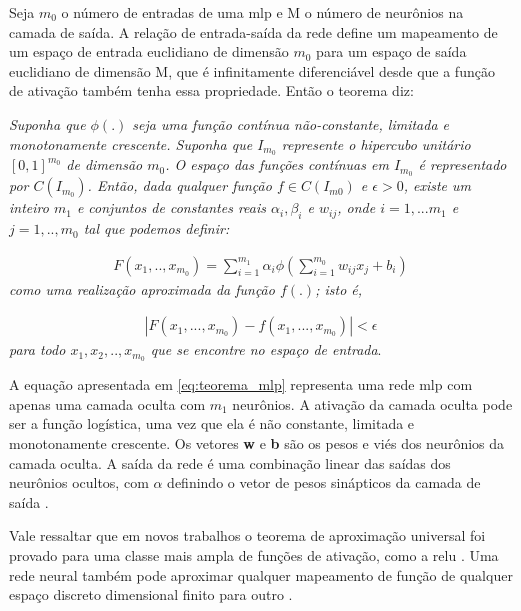 Seja $m_{0}$ o número de entradas de uma \acrshort{mlp} e M o número de neurônios na camada de saída. A relação de entrada-saída da rede define um mapeamento de um espaço de entrada euclidiano de dimensão $m_{0}$ para um espaço de saída euclidiano de dimensão M, que é infinitamente diferenciável desde que a função de ativação também tenha essa propriedade. Então o teorema diz:

\textit{Suponha que $\phi(.)$ seja uma função contínua não-constante, limitada e monotonamente crescente. Suponha que $I_{m_{0}}$ represente o hipercubo unitário $[0,1]^{m_{0}}$ de dimensão $m_{0}$. O espaço das funções contínuas em $I_{m_{0}}$ é representado por $C(I_{m_{0}})$. Então, dada qualquer função $f \in C(I_{m{0}})$ e $\epsilon>0$, existe um inteiro $m_{1}$ e conjuntos de constantes reais $\alpha_{i},\beta_{i}$ e $w_{ij}$, onde  $i = 1,...m_{1}$ e $j = 1, .., m_{0}$ tal que podemos definir:}

\begin{equation}
\label{eq:teorema_mlp}
\begin{aligned}
F(x_{1},..,x_{m_{0}}) = \sum_{i=1}^{m_{1}}\alpha_{i}\phi(\sum_{i=1}^{m_{0}}w_{ij}x_{j}+b_{i})
\end{aligned}
\end{equation}
\textit{como uma realização aproximada da função $f(.)$; isto é,}

\begin{equation}
\begin{aligned}
|F(x_{1},...,x_{m_{0}}) -f(x_{1},...,x_{m_{0}}) | < \epsilon
\end{aligned}
\end{equation}
\textit{para todo $x_{1},x_{2},..,x_{m_{0}}$ que se encontre no espaço de entrada}.

A equação apresentada em \ref{eq:teorema_mlp} representa uma rede \acrshort{mlp} com apenas uma camada oculta com $m_{1}$ neurônios. A ativação da camada oculta pode ser a função logística, uma vez que ela é não constante, limitada e monotonamente crescente. Os vetores \textbf{w} e \textbf{b} são os pesos e viés dos neurônios da camada oculta. A saída da rede é uma combinação linear das saídas dos neurônios ocultos, com \textbf{$\alpha$} definindo o vetor de pesos sinápticos da camada de saída \cite{Haykin}.  

Vale ressaltar que em novos trabalhos o teorema de aproximação universal foi provado para uma classe mais ampla de funções de ativação, como a \acrshort{relu} \cite{leshno1993multilayer}. Uma rede neural também pode aproximar qualquer mapeamento de função de qualquer espaço discreto dimensional finito para outro \cite{Goodfellow2016}.

